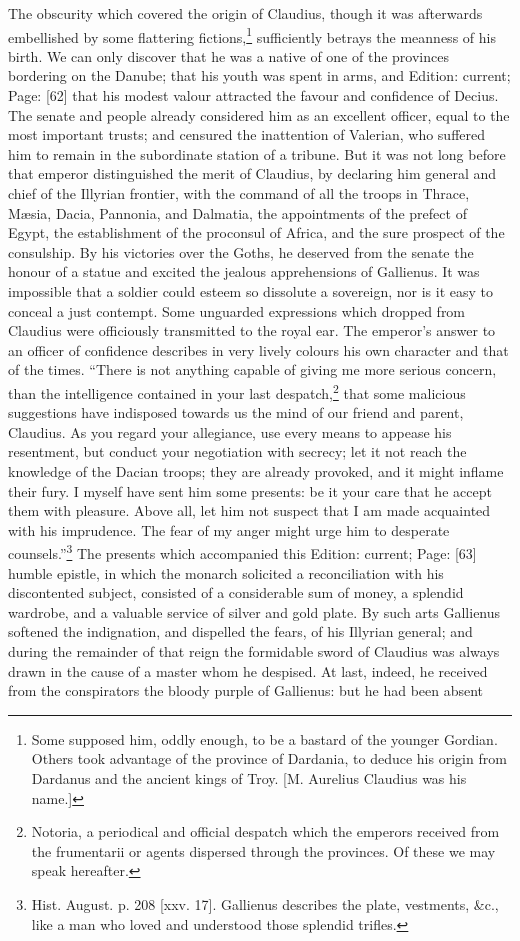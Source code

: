 The obscurity which covered the origin of Claudius, though it was afterwards embellished by some flattering fictions,\footnote{Some supposed him, oddly enough, to be a bastard of the younger Gordian. Others took advantage of the province of Dardania, to deduce his origin from Dardanus and the ancient kings of Troy. [M. Aurelius Claudius was his name.]} sufficiently betrays the meanness of his birth. We can only discover that he was a native of one of the provinces bordering on the Danube; that his youth was spent in arms, and Edition: current; Page: [62] that his modest valour attracted the favour and confidence of Decius. The senate and people already considered him as an excellent officer, equal to the most important trusts; and censured the inattention of Valerian, who suffered him to remain in the subordinate station of a tribune. But it was not long before that emperor distinguished the merit of Claudius, by declaring him general and chief of the Illyrian frontier, with the command of all the troops in Thrace, Mæsia, Dacia, Pannonia, and Dalmatia, the appointments of the prefect of Egypt, the establishment of the proconsul of Africa, and the sure prospect of the consulship. By his victories over the Goths, he deserved from the senate the honour of a statue and excited the jealous apprehensions of Gallienus. It was impossible that a soldier could esteem so dissolute a sovereign, nor is it easy to conceal a just contempt. Some unguarded expressions which dropped from Claudius were officiously transmitted to the royal ear. The emperor\texthebrew{}’s answer to an officer of confidence describes in very lively colours his own character and that of the times. \texthebrew{“}There is not anything capable of giving me more serious concern, than the intelligence contained in your last despatch,\footnote{Notoria, a periodical and official despatch which the emperors received from the frumentarii or agents dispersed through the provinces. Of these we may speak hereafter.} that some malicious suggestions have indisposed towards us the mind of our friend and parent, Claudius. As you regard your allegiance, use every means to appease his resentment, but conduct your negotiation with secrecy; let it not reach the knowledge of the Dacian troops; they are already provoked, and it might inflame their fury. I myself have sent him some presents: be it your care that he accept them with pleasure. Above all, let him not suspect that I am made acquainted with his imprudence. The fear of my anger might urge him to desperate counsels.\texthebrew{}”\footnote{Hist. August. p. 208 [xxv. 17]. Gallienus describes the plate, vestments, \&c., like a man who loved and understood those splendid trifles.} The presents which accompanied this Edition: current; Page: [63] humble epistle, in which the monarch solicited a reconciliation with his discontented subject, consisted of a considerable sum of money, a splendid wardrobe, and a valuable service of silver and gold plate. By such arts Gallienus softened the indignation, and dispelled the fears, of his Illyrian general; and during the remainder of that reign the formidable sword of Claudius was always drawn in the cause of a master whom he despised. At last, indeed, he received from the conspirators the bloody purple of Gallienus: but he had been absent 